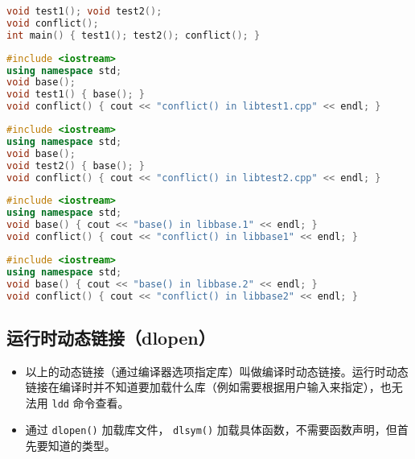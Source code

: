 \begin{lstlisting}[language=cpp, caption=main.cpp]
void test1(); void test2();
void conflict();
int main() { test1(); test2(); conflict(); }
\end{lstlisting}

\begin{lstlisting}[language=cpp, caption=libtest1.cpp]
#include <iostream>
using namespace std;
void base();
void test1() { base(); }
void conflict() { cout << "conflict() in libtest1.cpp" << endl; }
\end{lstlisting}

\begin{lstlisting}[language=cpp, caption=libtest2.cpp]
#include <iostream>
using namespace std;
void base();
void test2() { base(); }
void conflict() { cout << "conflict() in libtest2.cpp" << endl; }
\end{lstlisting}

\begin{lstlisting}[language=cpp, caption=libtest1.cpp]
#include <iostream>
using namespace std;
void base() { cout << "base() in libbase.1" << endl; }
void conflict() { cout << "conflict() in libbase1" << endl; }
\end{lstlisting}

\begin{lstlisting}[language=cpp, caption=libtest2.cpp]
#include <iostream>
using namespace std;
void base() { cout << "base() in libbase.2" << endl; }
void conflict() { cout << "conflict() in libbase2" << endl; }
\end{lstlisting}

\subsection{运行时动态链接（dlopen）}
\begin{itemize}
\item 以上的动态链接（通过编译器选项指定库）叫做编译时动态链接。运行时动态链接在编译时并不知道要加载什么库（例如需要根据用户输入来指定），也无法用 \verb`ldd` 命令查看。
\item 通过 \verb`dlopen()` 加载库文件， \verb`dlsym()` 加载具体函数，不需要函数声明，但首先要知道的类型。
\end{itemize}

